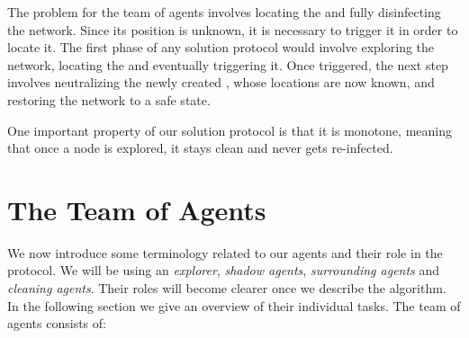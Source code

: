 The problem for the team of agents involves locating the \bv and fully disinfecting the network. Since its position is unknown, it is necessary to trigger it in order to locate it. The first phase of any solution protocol would involve exploring the network, locating the \bv and eventually triggering it. 
Once triggered, the next step involves neutralizing the newly created \bvs, whose locations are now known,  
and  restoring the network to a safe state.
 
One important property of our solution protocol is that it is monotone, meaning that once a node is explored, it stays clean and never gets re-infected.
 




\section{The Team of Agents} 


We now introduce some terminology related to our agents and their role in the protocol.
We will be using  an {\em explorer},    {\em shadow agents}, {\em surrounding agents}  and {\em cleaning agents}.  Their roles will become clearer once we describe the algorithm. In the following section we give an overview of their  individual tasks.
The team of agents consists of:

